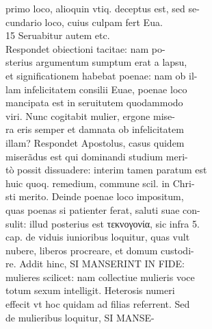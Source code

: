 \documentclass{article}
\begin{document}
\begin{pages}
                primo loco, alioquin vtiq. deceptus est, sed se- \\
                cundario loco, cuius culpam fert Eua. \\
                15 Seruabitur autem etc. \\
                Respondet obiectioni tacitae: nam po- \\
                sterius argumentum sumptum erat a lapsu, \\
                et significationem habebat poenae: nam ob il- \\
                lam infelicitatem consilii Euae, poenae loco \\
                mancipata est in seruitutem quodammodo \\
                viri. Nunc cogitabit mulier, ergone mise- \\
                ra eris semper et damnata ob infelicitatem \\
                illam? Respondet Apostolus, casus quidem \\
                miserãdus est qui dominandi studium meri- \\
                tò possit dissuadere: interim tamen paratum est \\
                huic quoq. remedium, commune scil. in Chri- \\
                sti merito. Deinde poenae loco impositum, \\
                quas poenas si patienter ferat, saluti suae con- \\
                sulit: illud posterius est τεκνογονία, sic infra 5. \\
                cap. de viduis iunioribus loquitur, quas vult \\
                nubere, liberos procreare, et domum custodi- \\
                re. Addit hinc, SI MANSERINT IN FIDE: \\
                mulieres scilicet: nam collectiue mulieris voce \\
                totum sexum intelligit. Heterosis numeri \\
                effecit vt hoc quidam ad filias referrent. Sed \\
                de mulieribus loquitur, SI MANSE- \\

\end{pages}
\end{document}
